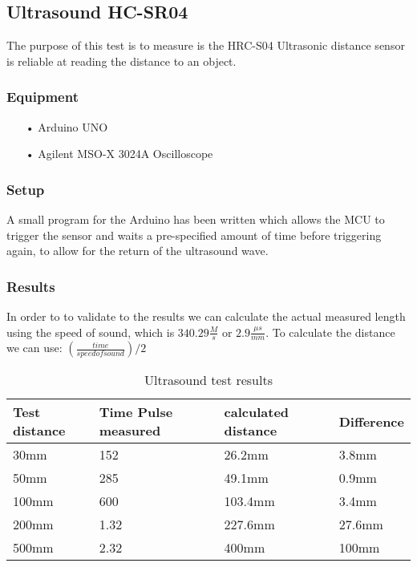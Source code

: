 \subsection{Ultrasound HC-SR04}
The purpose of this test is to measure is the HRC-S04 Ultrasonic distance sensor is reliable at reading the distance to an object.

\subsubsection{Equipment}

\begin{enumerate}
    \item[•]Arduino UNO
    \item[•]Agilent MSO-X 3024A Oscilloscope    
\end{enumerate}

\subsubsection{Setup}
A small program for the Arduino has been written which allows the MCU to trigger the sensor and waits a pre-specified amount of time before triggering again, to allow for the return of the ultrasound wave. 

\subsubsection{Results}
In order to to validate to the results we can calculate the actual measured length using the speed of sound, which is $ 340.29 \frac{M}{s} $ or $2.9\frac{\mu s}{mm}$. To calculate the distance we can use: $(\frac{time}{speed of sound})/2$ \cite{SOF}
\begin{table}[h]
\centering
\label{ultrasoundtestresults}
\begin{tabular}{|l|l|l|l|}
\hline
Test distance & Time Pulse measured & calculated  distance & Difference \\ \hline
30mm          & 152                 & 26.2mm               & 3.8mm      \\ \hline
50mm          & 285                 & 49.1mm               & 0.9mm      \\ \hline
100mm         & 600                 & 103.4mm              & 3.4mm      \\ \hline
200mm         & 1.32                & 227.6mm              & 27.6mm     \\ \hline
500mm         & 2.32                & 400mm                & 100mm      \\ \hline
\end{tabular}
\caption{Ultrasound test results}
\end{table}